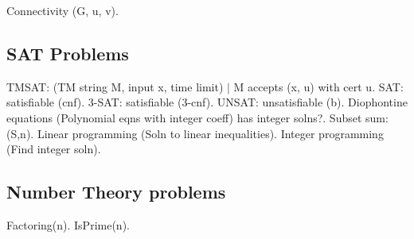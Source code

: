\documentclass[oneside, article]{memoir}
\begin{document}
Connectivity (G, u, v).

\subsection{SAT Problems}
TMSAT: (TM string M, input x, time limit) $|$ M accepts (x, u) with cert u. SAT: satisfiable (cnf). 3-SAT: satisfiable (3-cnf). UNSAT: unsatisfiable (b). Diophontine equations (Polynomial eqns with integer coeff) has integer solns?. Subset sum: (S,n). Linear programming (Soln to linear inequalities). Integer programming (Find integer soln).

\subsection{Number Theory problems}
Factoring(n). IsPrime(n).



\end{document}
